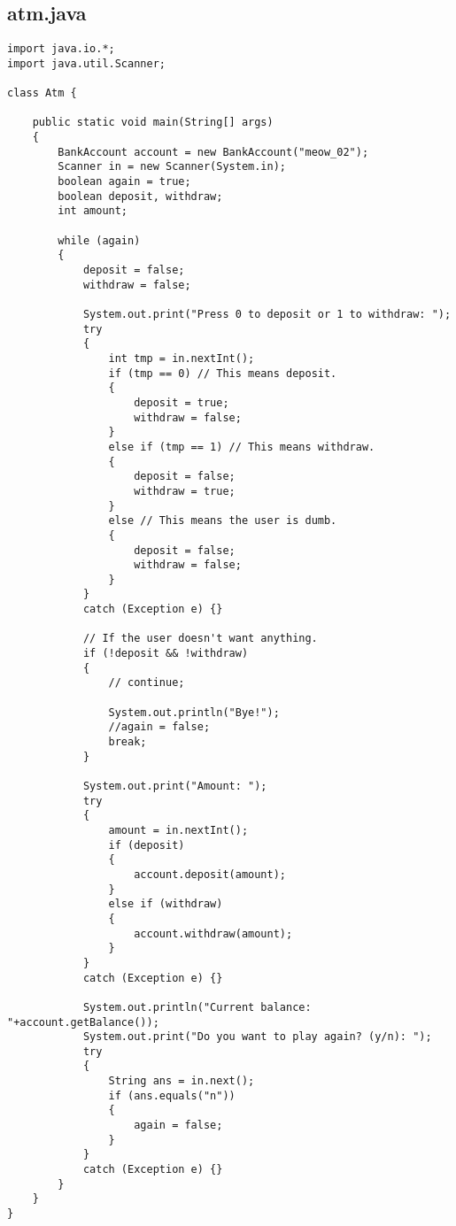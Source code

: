 \documentclass[a4paper,12pt]{article}
\begin{document}
\subsection{\textsf{atm.java}}
\begin{verbatim}
import java.io.*;
import java.util.Scanner;

class Atm {
    
    public static void main(String[] args)
    {
        BankAccount account = new BankAccount("meow_02");
        Scanner in = new Scanner(System.in);
        boolean again = true;
        boolean deposit, withdraw;
        int amount;

        while (again)
        {
            deposit = false;
            withdraw = false;

            System.out.print("Press 0 to deposit or 1 to withdraw: ");
            try 
            {
                int tmp = in.nextInt();
                if (tmp == 0) // This means deposit.
                {
                    deposit = true;
                    withdraw = false;
                }
                else if (tmp == 1) // This means withdraw.
                {
                    deposit = false;
                    withdraw = true;
                }
                else // This means the user is dumb.
                {
                    deposit = false;
                    withdraw = false;
                }
            }
            catch (Exception e) {}

            // If the user doesn't want anything.
            if (!deposit && !withdraw)             
            {
                // continue;

                System.out.println("Bye!");
                //again = false;
                break;
            }

            System.out.print("Amount: ");
            try
            {
                amount = in.nextInt();
                if (deposit)
                {
                    account.deposit(amount);
                }
                else if (withdraw)
                {
                    account.withdraw(amount);
                }
            }
            catch (Exception e) {}

            System.out.println("Current balance: "+account.getBalance());
            System.out.print("Do you want to play again? (y/n): ");
            try
            {
                String ans = in.next();
                if (ans.equals("n"))
                {
                    again = false;
                }
            }
            catch (Exception e) {}
        }
    }
}
\end{verbatim}
\end{document}
